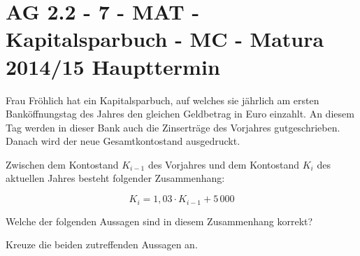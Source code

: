 \section{AG 2.2 - 7 - MAT - Kapitalsparbuch - MC - Matura 2014/15 Haupttermin}

\begin{beispiel}[AG 2.2]{1} %
Frau Fröhlich hat ein Kapitalsparbuch, auf welches sie jährlich am ersten Bank\-öffnungstag des Jahres den gleichen Geldbetrag in Euro einzahlt. An diesem Tag werden in dieser Bank auch die
Zinserträge des Vorjahres gutgeschrieben. Danach wird der neue Gesamtkontostand ausgedruckt. \leer

Zwischen dem Kontostand $K_{i-1}$ des Vorjahres und dem Kontostand $K_i$ des aktuellen Jahres besteht folgender Zusammenhang: 

$$K_i=1,03\cdot K_{i-1} + 5\,000$$

Welche der folgenden Aussagen sind in diesem Zusammenhang korrekt?

Kreuze die beiden zutreffenden Aussagen an.

\end{beispiel}